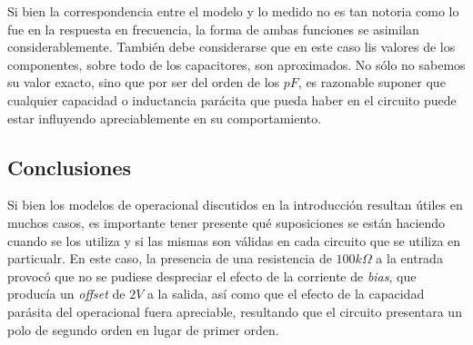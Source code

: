 \documentclass[../../main.tex]{subfiles}
\begin{document}

Si bien la correspondencia entre el modelo y lo medido no es tan notoria como lo fue en la respuesta en frecuencia, la forma de ambas funciones se asimilan considerablemente. Tambi\'en debe considerarse que en este caso lis valores de los componentes, sobre todo de los capacitores, son aproximados. No s\'olo no sabemos su valor exacto, sino que por ser del orden de los $pF$, es razonable suponer que cualquier capacidad o inductancia par\'acita que pueda haber en el circuito puede estar influyendo apreciablemente en su comportamiento. \par

\subsection{Conclusiones}

Si bien los modelos de operacional discutidos en la introducci\'on resultan \'utiles en muchos casos, es importante tener presente qu\'e suposiciones se est\'an haciendo cuando se los utiliza y si las mismas son v\'alidas en cada circuito que se utiliza en particualr. En este caso, la presencia de una resistencia de $100k\Omega$ a la entrada provoc\'o que no se pudiese despreciar el efecto de la corriente de \textit{bias}, que produc\'ia un \textit{offset} de $2V$ a la salida, as\'i como que el efecto de la capacidad par\'asita del operacional fuera apreciable, resultando que el circuito presentara un polo de segundo orden en lugar de primer orden. 
\end{document}
